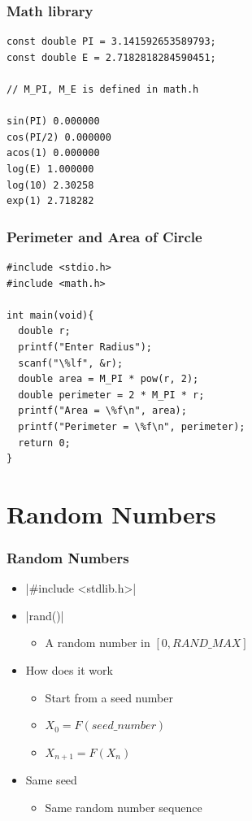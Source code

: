 \documentclass{../c-lecture}
\begin{document}
\begin{frame}[fragile]
  \frametitle{Math library}
  \begin{verbatim}
const double PI = 3.141592653589793;
const double E = 2.7182818284590451;

// M_PI, M_E is defined in math.h

sin(PI) 0.000000
cos(PI/2) 0.000000
acos(1) 0.000000
log(E) 1.000000
log(10) 2.30258
exp(1) 2.718282
  \end{verbatim}
\end{frame}

\begin{frame}[fragile]
  \frametitle{Perimeter and Area of Circle}
  \begin{verbatim}
#include <stdio.h>
#include <math.h>

int main(void){
  double r;
  printf("Enter Radius");
  scanf("\%lf", &r);
  double area = M_PI * pow(r, 2);
  double perimeter = 2 * M_PI * r;
  printf("Area = \%f\n", area);
  printf("Perimeter = \%f\n", perimeter);
  return 0;
}
  \end{verbatim}
\end{frame}

\section{Random Numbers}

\begin{frame}[fragile]
  \frametitle{Random Numbers}
  \begin{itemize}
    \item {}|#include <stdlib.h>|
    \item {}|rand()|
    \begin{itemize}
      \item A random number in $[0, RAND\_MAX]$
    \end{itemize}
    \item How does it work
    \begin{itemize}
      \item Start from a {\color{Orange} seed} number
      \item $X_0 = F(seed\_number)$
      \item $X_{n + 1} = F(X_n)$
    \end{itemize}
    \item Same seed
    \begin{itemize}
      \item Same random number sequence
    \end{itemize}
  \end{itemize}
\end{frame}
\end{document}
